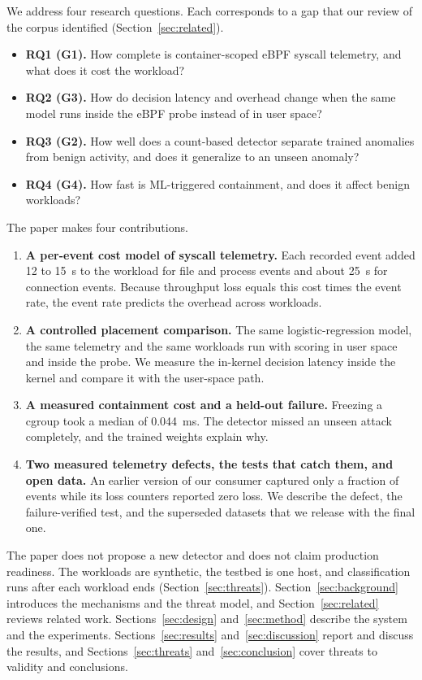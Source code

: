 We address four research questions. Each corresponds to a gap that our review of the corpus identified (Section~\ref{sec:related}).
\begin{itemize}
  \item \textbf{RQ1 (G1).} How complete is container-scoped eBPF syscall telemetry, and what does it cost the workload?
  \item \textbf{RQ2 (G3).} How do decision latency and overhead change when the same model runs inside the eBPF probe instead of in user space?
  \item \textbf{RQ3 (G2).} How well does a count-based detector separate trained anomalies from benign activity, and does it generalize to an unseen anomaly?
  \item \textbf{RQ4 (G4).} How fast is ML-triggered containment, and does it affect benign workloads?
\end{itemize}

The paper makes four contributions.
\begin{enumerate}
  \item \textbf{A per-event cost model of syscall telemetry.} Each recorded event added 12 to 15~\textmu s to the workload for file and process events and about 25~\textmu s for connection events. Because throughput loss equals this cost times the event rate, the event rate predicts the overhead across workloads.
  \item \textbf{A controlled placement comparison.} The same logistic-regression model, the same telemetry and the same workloads run with scoring in user space and inside the probe. We measure the in-kernel decision latency inside the kernel and compare it with the user-space path.
  \item \textbf{A measured containment cost and a held-out failure.} Freezing a cgroup took a median of 0.044~ms. The detector missed an unseen attack completely, and the trained weights explain why.
  \item \textbf{Two measured telemetry defects, the tests that catch them, and open data.} An earlier version of our consumer captured only a fraction of events while its loss counters reported zero loss. We describe the defect, the failure-verified test, and the superseded datasets that we release with the final one.
\end{enumerate}

The paper does not propose a new detector and does not claim production readiness. The workloads are synthetic, the testbed is one host, and classification runs after each workload ends (Section~\ref{sec:threats}). Section~\ref{sec:background} introduces the mechanisms and the threat model, and Section~\ref{sec:related} reviews related work. Sections~\ref{sec:design} and~\ref{sec:method} describe the system and the experiments. Sections~\ref{sec:results} and~\ref{sec:discussion} report and discuss the results, and Sections~\ref{sec:threats} and~\ref{sec:conclusion} cover threats to validity and conclusions.
